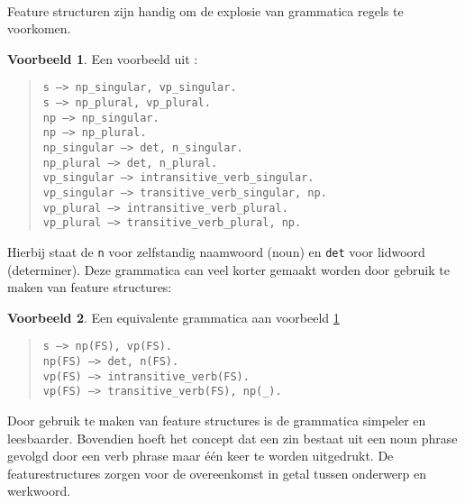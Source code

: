 \documentclass[]{article}
\theoremstyle{definition}
\newtheorem{ex}{Voorbeeld}[section]
\begin{document}
\paragraph{} Feature structuren zijn handig om de explosie van grammatica regels te voorkomen.
\begin{ex}  Een voorbeeld uit \cite{FeatureStructuresExplosion}:
  \label{ex:explosion}
  \begin{quote}
    \texttt{s ---> np\_{singular}, vp\_{singular}.} \\
    \texttt{s ---> np\_{plural}, vp\_{plural}.} \\
    \texttt{np ---> np\_{singular}.} \\
    \texttt{np ---> np\_{plural}.} \\
    \texttt{np\_{singular} ---> det, n\_{singular}.} \\
    \texttt{np\_{plural} ---> det, n\_{plural}.} \\
    \texttt{vp\_{singular} ---> intransitive\_verb\_{singular}.} \\
    \texttt{vp\_{singular} ---> transitive\_verb\_{singular}, np.} \\
    \texttt{vp\_{plural} ---> intransitive\_verb\_{plural}.} \\
    \texttt{vp\_{plural} ---> transitive\_verb\_{plural}, np.} \\
  \end{quote}
\end{ex} 
Hierbij staat de \texttt{n} voor zelfstandig naamwoord (noun) en \texttt{det} voor lidwoord (determiner). Deze grammatica can veel korter gemaakt worden door gebruik te maken van feature structures:

\begin{ex}  Een equivalente grammatica aan voorbeeld \ref{ex:explosion}
  \begin{quote}
    \texttt{s ---> np(FS), vp(FS).} \\
    \texttt{np(FS) ---> det, n(FS).} \\
    \texttt{vp(FS) ---> intransitive\_verb(FS).} \\
    \texttt{vp(FS) ---> transitive\_verb(FS), np(\_).} \\
  \end{quote}
\end{ex} 

Door gebruik te maken van feature structures is de grammatica simpeler en leesbaarder. Bovendien hoeft het concept dat een zin bestaat uit een noun phrase gevolgd door een verb phrase maar één keer te worden uitgedrukt. De featurestructures zorgen voor de overeenkomst in getal tussen onderwerp en werkwoord.
\end{document}
